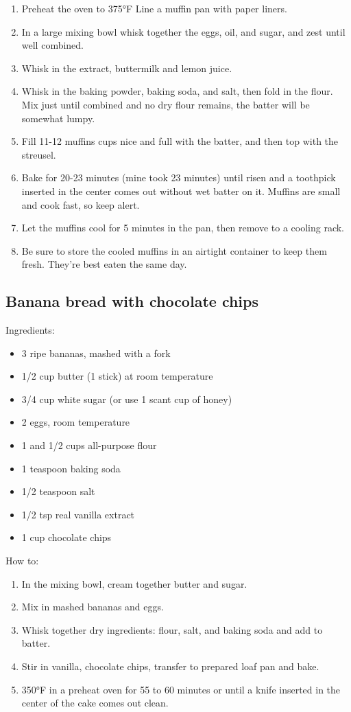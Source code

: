 \documentclass[a4paper, 12pt]{article}
\begin{document}
\begin{enumerate}
	\item Preheat the oven to 375°F Line a muffin pan with paper liners.
	\item In a large mixing bowl whisk together the eggs, oil, and sugar, and zest until well combined.
	\item Whisk in the extract, buttermilk and lemon juice.
	\item Whisk in the baking powder, baking soda, and salt, then fold in the flour. Mix just until combined and no dry flour remains, the batter will be somewhat lumpy.
	\item Fill 11-12 muffins cups nice and full with the batter, and then top with the streusel.
	\item Bake for 20-23 minutes (mine took 23 minutes) until risen and a toothpick inserted in the center comes out without wet batter on it. Muffins are small and cook fast, so keep alert.
	\item Let the muffins cool for 5 minutes in the pan, then remove to a cooling rack.
	\item Be sure to store the cooled muffins in an airtight container to keep them fresh. They're best eaten the same day.
\end{enumerate}

\newpage
\subsection{Banana bread with chocolate chips}

Ingredients:

\begin{itemize}
	\item 3 ripe bananas, mashed with a fork
	\item 1/2 cup butter (1 stick) at room temperature
	\item 3/4 cup white sugar (or use 1 scant cup of honey)
	\item 2 eggs, room temperature
	\item 1 and 1/2 cups all-purpose flour
	\item 1 teaspoon baking soda
	\item 1/2 teaspoon salt
	\item 1/2 tsp real vanilla extract
	\item 1 cup chocolate chips	
\end{itemize}

How to:

\begin{enumerate}
	\item In the mixing bowl, cream together butter and sugar.
	\item Mix in mashed bananas and eggs.
	\item Whisk together dry ingredients: flour, salt, and baking soda and add to batter.
	\item Stir in vanilla, chocolate chips, transfer to prepared loaf pan and bake.
	\item 350°F in a preheat oven for 55 to 60 minutes or until a knife inserted in the center of the cake comes out clean.
\end{enumerate}

\newpage
\end{document}

